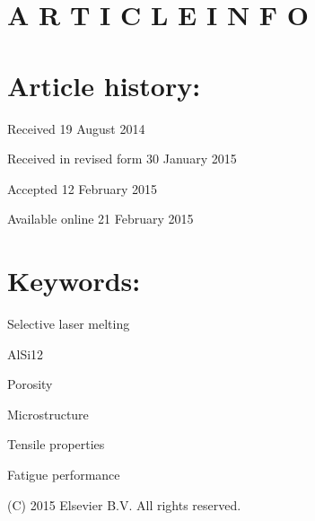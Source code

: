 \documentclass[10pt]{article}
\begin{document}
\section*{A R T I C L E I N F O}
\section*{Article history:}
Received 19 August 2014

Received in revised form 30 January 2015

Accepted 12 February 2015

Available online 21 February 2015

\section*{Keywords:}
Selective laser melting

AlSi12

Porosity

Microstructure

Tensile properties

Fatigue performance

\begin{abstract}
A B S T R A C T Selective laser melting (SLM) offers high potential for manufacturing complex geometries and custommade parts due to its unique layer-wise production process. A series of samples of AlSi12 have been manufactured by SLM process to study the effect of process parameters and post-build heat treatment on the microstructure and the corresponding mechanical properties. Optical microscope, scanning electron microscope, quasistatic tests, continuous load increase fatigue tests and constant amplitude fatigue tests have been employed for characterization. A remarkable eutectic microstructure, with dendritic width changing with SLM process parameters, has been observed. Relationship between SLM process parameters, resulting microstructure and the consequent changes in mechanical properties has been discussed. Base plate heating has been found critical in controlling the in-process microstructure. Mechanical properties of SLM parts outperform those of conventionally manufactured alloy, and can be varied as per requirement, by altering the build rate, keeping the process costs in control. Fatigue scatter can also be controlled by heating the base plate during the process.
\end{abstract}

(C) 2015 Elsevier B.V. All rights reserved.
\end{document}
